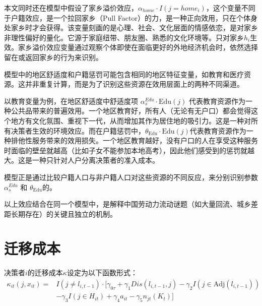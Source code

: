 \documentclass[
  a4paper,
  zihao=-4,
  fontset=mac,
  AutoFakeBold,
  AutoFakeSlant,
  oneside]{ctexbook}
\begin{document}
本文同时还在模型中假设了家乡溢价效应，$\alpha_{home} \cdot I(j=home_i)$，这个变量不同于户籍效应，是一个拉回家乡（Pull Factor）的力，是一种正向效用，只在个体身处家乡时才会获得。该变量刻画的是心理、社会、文化层面的情感依恋，是对家乡非理性偏好的量化。它源于家庭纽带、朋友圈、熟悉的文化环境等。只对家乡$h_i$生效。家乡溢价效应变量通过观察个体即使在面临更好的外地经济机会时，依然选择留在或返回家乡的行为来识别。

模型中的地区舒适度和户籍惩罚可能包含相同的地区特征变量，如教育和医疗资源。这并非重复计算，而是为了识别这些资源在效用层面上的两种不同渠道。

以教育变量为例，在地区舒适度中舒适度项 $\alpha_s^{Edu} \cdot \text{Edu}(j)$ 代表教育资源作为一种公共品带来的普遍效用。一个地区教育好，所有人（无论有无户口）都会觉得这个地方有文化氛围、重视下一代，从而增加其作为居住地的吸引力。这是一种对所有决策者生效的环境效应。而在户籍惩罚中，$\theta_{\text{Edu}} \cdot \text{Edu}(j)$代表教育资源作为一种排他性服务带来的效用损失。一个地区教育越好，没有户口的人在享受这种服务时面临的壁垒就越高（比如子女不能参加本地高考），因此他们感受到的惩罚就越大。这是一种只针对人户分离决策者的准入成本。

模型正是通过比较户籍人口与非户籍人口对这些资源的不同反应，来分别识别参数 $\alpha_s^{Edu}$ 和 $\theta_{\text{Edu}} $的。


以上效应结合在同一个模型中，是解释中国劳动力流动谜题（如大量回流、城乡差距长期存在）的关键且独立的机制。


\section{迁移成本}

决策者$i$的迁移成本$\kappa$设定为以下函数形式：
\begin{equation}
\begin{split}
\kappa_{it}(j, x_{it}) = & I(j \neq l_{i,t-1}) \cdot \biggl[ \gamma_{0\tau} + \gamma_1 Dis(l_{i,t-1}, j) - \gamma_2 I(j \in \text{Adj}(l_{i,t-1})) \\
    & - \gamma_3 I(j \in H_{it}) + \gamma_4 a_{it} - \gamma_5 n_{jt}(K_t) \biggr]
\end{split}
\label{eq:迁移成本函数}
\end{equation}
\end{document}

